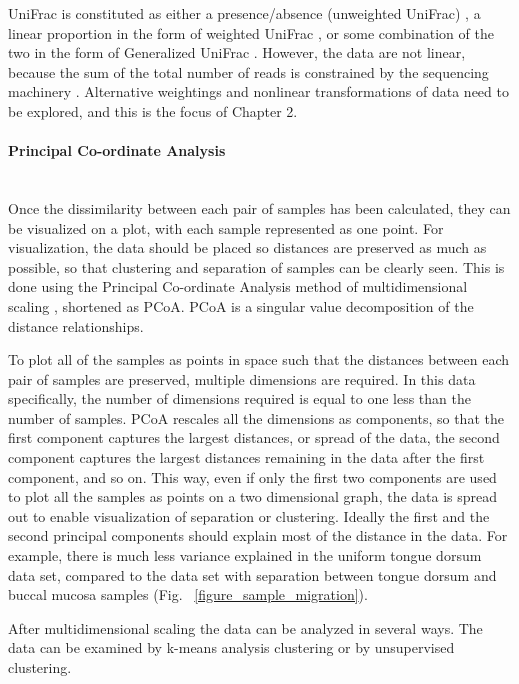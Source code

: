 UniFrac is constituted as either a presence/absence (unweighted UniFrac) \cite{lozupone2005unifrac}, a linear proportion in the form of weighted UniFrac \cite{lozupone2007quantitative}, or some combination of the two in the form of Generalized UniFrac \cite{chen2012associating}. However, the data are not linear, because the sum of the total number of reads is constrained by the sequencing machinery \cite{friedman2012inferring}. Alternative weightings and nonlinear transformations of data need to be explored, and this is the focus of Chapter 2.

\paragraph{Principal Co-ordinate Analysis}\mbox{}\\
Once the dissimilarity between each pair of samples has been calculated, they can be visualized on a plot, with each sample represented as one point. For visualization, the data should be placed so distances are preserved as much as possible, so that clustering and separation of samples can be clearly seen. This is done using the Principal Co-ordinate Analysis method of multidimensional scaling \cite{dollhopf2001interpreting}, shortened as PCoA. PCoA is a singular value decomposition of the distance relationships.

To plot all of the samples as points in space such that the distances between each pair of samples are preserved, multiple dimensions are required. In this data specifically, the number of dimensions required is equal to one less than the number of samples. PCoA rescales all the dimensions as components, so that the first component captures the largest distances, or spread of the data, the second component captures the largest distances remaining in the data after the first component, and so on. This way, even if only the first two components are used to plot all the samples as points on a two dimensional graph, the data is spread out to enable visualization of separation or clustering. Ideally the first and the second principal components should explain most of the distance in the data. For example, there is much less variance explained in the uniform tongue dorsum data set, compared to the data set with separation between tongue dorsum and buccal mucosa samples (Fig. ~\ref{figure_sample_migration}).

After multidimensional scaling the data can be analyzed in several ways. The data can be examined by k-means analysis clustering \cite{tibshirani2005cluster} or by unsupervised clustering.

